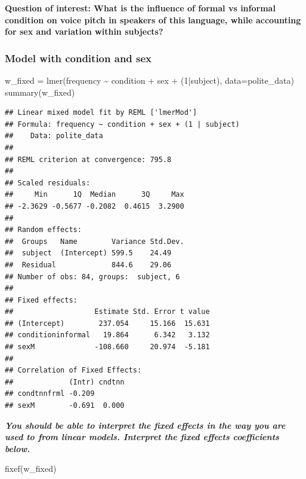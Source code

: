 \documentclass[
  openany]{book}
\newenvironment{Shaded}{\begin{snugshade}}{\end{snugshade}}
\newcommand{\AttributeTok}[1]{\textcolor[rgb]{0.77,0.63,0.00}{#1}}
\newcommand{\DecValTok}[1]{\textcolor[rgb]{0.00,0.00,0.81}{#1}}
\newcommand{\FunctionTok}[1]{\textcolor[rgb]{0.00,0.00,0.00}{#1}}
\newcommand{\NormalTok}[1]{#1}
\newcommand{\OtherTok}[1]{\textcolor[rgb]{0.56,0.35,0.01}{#1}}
\newcommand{\SpecialCharTok}[1]{\textcolor[rgb]{0.00,0.00,0.00}{#1}}
\begin{document}
\textbf{Question of interest: What is the influence of formal vs informal condition on voice pitch in speakers of this language, while accounting for sex and variation within subjects?}

\hypertarget{model-with-condition-and-sex}{%
\subsubsection{Model with condition and sex}\label{model-with-condition-and-sex}}

\begin{Shaded}
\begin{Highlighting}[]
\NormalTok{w\_fixed }\OtherTok{=} \FunctionTok{lmer}\NormalTok{(frequency }\SpecialCharTok{\textasciitilde{}}\NormalTok{ condition }\SpecialCharTok{+}\NormalTok{ sex }\SpecialCharTok{+}\NormalTok{ (}\DecValTok{1}\SpecialCharTok{|}\NormalTok{subject), }\AttributeTok{data=}\NormalTok{polite\_data)}
\FunctionTok{summary}\NormalTok{(w\_fixed)}
\end{Highlighting}
\end{Shaded}

\begin{verbatim}
## Linear mixed model fit by REML ['lmerMod']
## Formula: frequency ~ condition + sex + (1 | subject)
##    Data: polite_data
## 
## REML criterion at convergence: 795.8
## 
## Scaled residuals: 
##     Min      1Q  Median      3Q     Max 
## -2.3629 -0.5677 -0.2082  0.4615  3.2900 
## 
## Random effects:
##  Groups   Name        Variance Std.Dev.
##  subject  (Intercept) 599.5    24.49   
##  Residual             844.6    29.06   
## Number of obs: 84, groups:  subject, 6
## 
## Fixed effects:
##                   Estimate Std. Error t value
## (Intercept)        237.054     15.166  15.631
## conditioninformal   19.864      6.342   3.132
## sexM              -108.660     20.974  -5.181
## 
## Correlation of Fixed Effects:
##             (Intr) cndtnn
## condtnnfrml -0.209       
## sexM        -0.691  0.000
\end{verbatim}

\textbf{\emph{You should be able to interpret the fixed effects in the way you are used to from linear models. Interpret the fixed effects coefficients below.}}

\begin{Shaded}
\begin{Highlighting}[]
\FunctionTok{fixef}\NormalTok{(w\_fixed)}
\end{Highlighting}
\end{Shaded}
\end{document}
